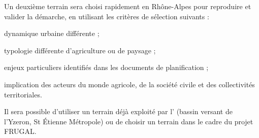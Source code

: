 Un deuxième terrain sera choisi rapidement en Rhône-Alpes pour reproduire
et valider la démarche, en utilisant les critères de sélection suivants :

\startitemize[packed]

\item dynamique urbaine différente ;
\item typologie différente d’agriculture ou de paysage ;
\item enjeux particuliers identifiés dans les documents de planification ;
\item implication des acteurs du monde agricole, de la société civile
  et des collectivités territoriales.

\stopitemize

Il sera possible d'utiliser un terrain déjà exploité par l'{\UMR} {\EVS} (bassin versant de l'Yzeron,
St Étienne Métropole) ou de choisir un terrain dans le cadre du projet FRUGAL.